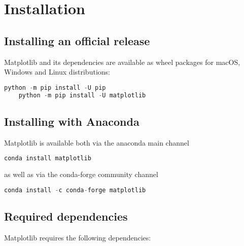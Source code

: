 \section{Installation}

\subsection{Installing an official release}

Matplotlib and its dependencies are available as wheel packages for macOS, Windows and Linux distributions:

\begin{lstlisting}[language=Python, style=pythonstyle, caption={Installing/upgrading pip and matplotlib}, label={code:pip-matplotlib}]
	python -m pip install -U pip
	python -m pip install -U matplotlib
\end{lstlisting}



\subsection{Installing with Anaconda}

Matplotlib is available both via the anaconda main channel

\begin{lstlisting}[language=Python, style=pythonstyle, caption={Installing matplotlib using conda}, label={code:conda-matplotlib}]
	conda install matplotlib
\end{lstlisting}


as well as via the conda-forge community channel

\begin{lstlisting}[language=Python, style=pythonstyle, caption={Installing matplotlib from conda-forge}, label={code:conda-forge-matplotlib}]
	conda install -c conda-forge matplotlib
\end{lstlisting}


\subsection{Required dependencies}

Matplotlib requires the following dependencies:

